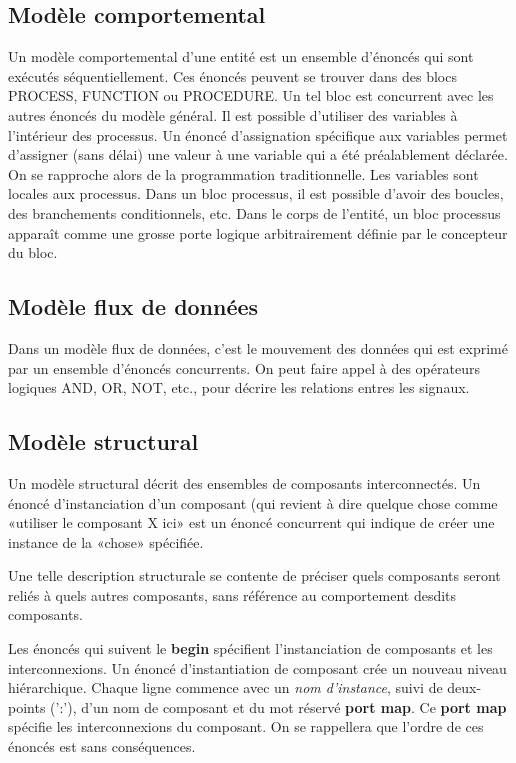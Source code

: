\documentclass[11pt]{article}
\begin{document}
\subsection{Modèle comportemental}
\label{sec:org50b02bf}

Un modèle comportemental d'une entité est un ensemble d'énoncés qui
sont exécutés séquentiellement. Ces énoncés peuvent se trouver dans
des blocs PROCESS, FUNCTION ou PROCEDURE. Un tel bloc est concurrent
avec les autres énoncés du modèle général. Il est possible d'utiliser
des variables à l'intérieur des processus. Un énoncé d'assignation
spécifique aux variables permet d'assigner (sans délai) une valeur à
une variable qui a été préalablement déclarée. On se rapproche alors
de la programmation traditionnelle. Les variables sont locales aux
processus. Dans un bloc processus, il est possible d'avoir des
boucles, des branchements conditionnels, etc. Dans le corps de
l'entité, un bloc processus apparaît comme une grosse porte logique
arbitrairement définie par le concepteur du bloc.

\subsection{Modèle flux de données}
\label{sec:orga66262e}

Dans un modèle flux de données, c'est le mouvement des données qui est
exprimé par un ensemble d'énoncés concurrents. On peut faire appel à
des opérateurs logiques AND, OR, NOT, etc., pour décrire les relations
entres les signaux.

\subsection{Modèle structural}
\label{sec:org716e1e4}

Un modèle structural décrit des ensembles de composants
interconnectés. Un énoncé d'instanciation d'un composant (qui revient
à dire quelque chose comme «utiliser le composant X ici» est un énoncé
concurrent qui indique de créer une instance de la «chose» spécifiée.

Une telle description structurale se contente de préciser quels
composants seront reliés à quels autres composants, sans référence au
comportement desdits composants.

Les énoncés qui suivent le \textbf{begin} spécifient l'instanciation de
composants et les interconnexions. Un énoncé d'instantiation de
composant crée un nouveau niveau hiérarchique. Chaque ligne commence
avec un \emph{nom d'instance}, suivi de deux-points (':'), d'un nom de
composant et du mot réservé \textbf{port map}.  Ce \textbf{port map} spécifie les
interconnexions du composant. On se rappellera que l'ordre de ces
énoncés est sans conséquences.
\end{document}
